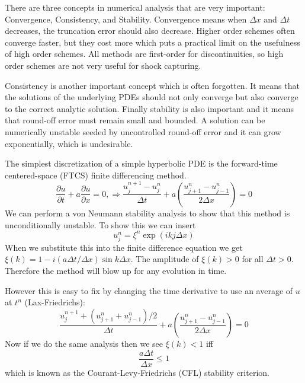 \documentclass[letterpaper, 11pt]{article}
\numberwithin{equation}{section}
\numberwithin{figure}{section}
\begin{document}
There are three concepts in numerical analysis that are very important:
Convergence, Consistency, and Stability. Convergence means when $\Delta x$ and
$\Delta t$ decreases, the truncation error should also decrease. Higher order
schemes often converge faster, but they cost more which puts a practical limit
on the usefulness of high order schemes. All methods are first-order for
discontinuities, so high order schemes are not very useful for shock capturing.

Consistency is another important concept which is often forgotten. It means that
the solutions of the underlying PDEs should not only converge but also converge
to the correct analytic solution. Finally stability is also important and it
means that round-off error must remain small and bounded. A solution can be
numerically unstable seeded by uncontrolled round-off error and it can grow
exponentially, which is undesirable.

The simplest discretization of a simple hyperbolic PDE is the forward-time
centered-space (FTCS) finite differencing method.
\begin{equation}
  \label{eq:7}
  \frac{\partial u}{\partial t} + a\frac{\partial u}{\partial x} = 0,\Longrightarrow \frac{u_j^{n+1} - u_j^n}{\Delta t} + a \left( \frac{u_{j+1}^n - u_{j-1}^n}{2\Delta x} \right) = 0
\end{equation}
We can perform a von Neumann stability analysis to show that this method is
unconditionally unstable. To show this we can insert
\begin{equation}
  \label{eq:8}
  u_j^n = \xi^n\exp(ikj\Delta x)
\end{equation}
When we substitute this into the finite difference equation we get $\xi(k) = 1 -
i(a\Delta t/\Delta x)\sin k\Delta x$. The amplitude of $\xi(k) > 0$ for all
$\Delta t > 0$. Therefore the method will blow up for any evolution in time.

However this is easy to fix by changing the time derivative to use an average of
$u$ at $t^n$ (Lax-Friedrichs):
\begin{equation}
  \label{eq:9}
  \frac{u_j^{n+1} + (u_{j+1}^n + u_{j-1}^n)/2}{\Delta t} + a \left( \frac{u_{j+1}^n - u_{j-1}^n}{2\Delta x} \right) = 0
\end{equation}
Now if we do the same analysis then we see $\xi(k) < 1$ iff
\begin{equation}
  \label{eq:10}
  \frac{a \Delta t}{\Delta x} \leq 1
\end{equation}
which is known as the Courant-Levy-Friedrichs (CFL) stability criterion.
\end{document}
